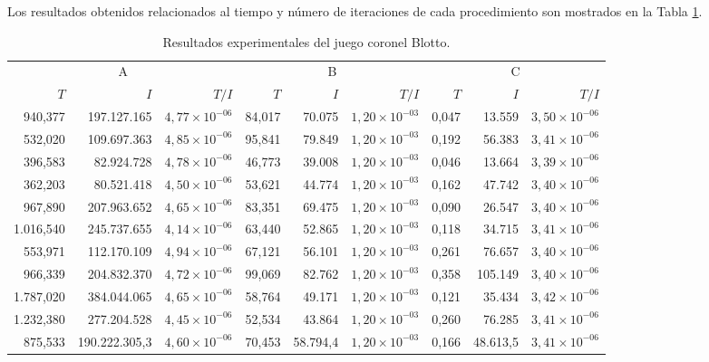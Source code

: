 Los resultados obtenidos relacionados al tiempo y número de iteraciones de cada procedimiento son mostrados en la Tabla \ref{tab:resultados-coronel-blotto}.

\begin{table}[t]
    \centering
    \caption{Resultados experimentales del juego coronel Blotto.}
    \label{tab:resultados-coronel-blotto}
    \scriptsize
    \begin{tabular}{r r r r r r r r r}
    \toprule
    \multicolumn{3}{c}{A} & \multicolumn{3}{c}{B} & \multicolumn{3}{c}{C} \\ \cmidrule(r){1-3} \cmidrule(lr){4-6} \cmidrule(l){7-9}
    $T$ & $I$ & $T/I$ & $T$ & $I$ & $T/I$ & $T$ & $I$ & $T/I$ \\  \cmidrule(r){1-3} \cmidrule(lr){4-6} \cmidrule(l){7-9}
      940,377 & 197.127.165   & $4,77 {\times} 10^{-06}$ & 84,017 & 70.075   & $1,20 {\times} 10^{-03}$ & 0,047 &  13.559   & $3,50 {\times} 10^{-06}$ \\
      532,020 & 109.697.363   & $4,85 {\times} 10^{-06}$ & 95,841 & 79.849   & $1,20 {\times} 10^{-03}$ & 0,192 &  56.383   & $3,41 {\times} 10^{-06}$ \\
      396,583 &  82.924.728   & $4,78 {\times} 10^{-06}$ & 46,773 & 39.008   & $1,20 {\times} 10^{-03}$ & 0,046 &  13.664   & $3,39 {\times} 10^{-06}$ \\
      362,203 &  80.521.418   & $4,50 {\times} 10^{-06}$ & 53,621 & 44.774   & $1,20 {\times} 10^{-03}$ & 0,162 &  47.742   & $3,40 {\times} 10^{-06}$ \\
      967,890 & 207.963.652   & $4,65 {\times} 10^{-06}$ & 83,351 & 69.475   & $1,20 {\times} 10^{-03}$ & 0,090 &  26.547   & $3,40 {\times} 10^{-06}$ \\
    1.016,540 & 245.737.655   & $4,14 {\times} 10^{-06}$ & 63,440 & 52.865   & $1,20 {\times} 10^{-03}$ & 0,118 &  34.715   & $3,41 {\times} 10^{-06}$ \\
      553,971 & 112.170.109   & $4,94 {\times} 10^{-06}$ & 67,121 & 56.101   & $1,20 {\times} 10^{-03}$ & 0,261 &  76.657   & $3,40 {\times} 10^{-06}$ \\
      966,339 & 204.832.370   & $4,72 {\times} 10^{-06}$ & 99,069 & 82.762   & $1,20 {\times} 10^{-03}$ & 0,358 & 105.149   & $3,40 {\times} 10^{-06}$ \\
    1.787,020 & 384.044.065   & $4,65 {\times} 10^{-06}$ & 58,764 & 49.171   & $1,20 {\times} 10^{-03}$ & 0,121 &  35.434   & $3,42 {\times} 10^{-06}$ \\
    1.232,380 & 277.204.528   & $4,45 {\times} 10^{-06}$ & 52,534 & 43.864   & $1,20 {\times} 10^{-03}$ & 0,260 &  76.285   & $3,41 {\times} 10^{-06}$ \\ \cmidrule(r){1-3} \cmidrule(lr){4-6} \cmidrule(l){7-9}
      875,533 & 190.222.305,3 & $4,60 {\times} 10^{-06}$ & 70,453 & 58.794,4 & $1,20 {\times} 10^{-03}$ & 0,166 &  48.613,5 & $3,41 {\times} 10^{-06}$ \\ \bottomrule
    \end{tabular}
\end{table}

